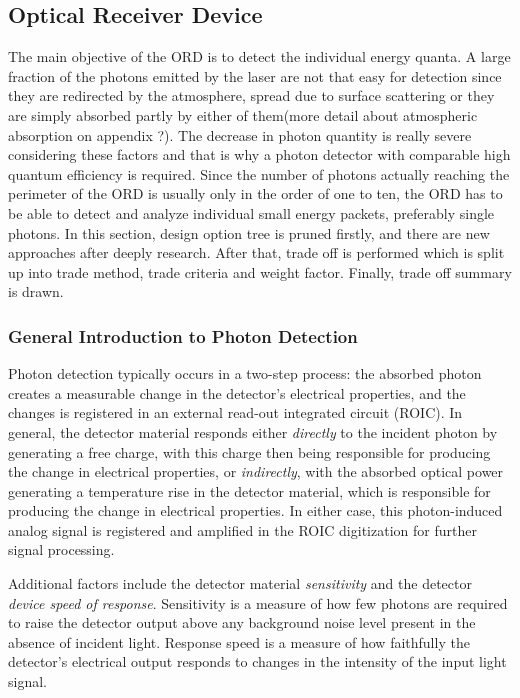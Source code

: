 \subsection{Optical Receiver Device}
\label{TOORD}
The main objective of the \ac{ORD} is to detect the individual energy quanta. A large fraction of the photons emitted by the \acs{laser} are not that easy for detection since they are redirected by the atmosphere, spread due to surface scattering or they are simply absorbed partly by either of them(more detail about atmospheric absorption on appendix ?). The decrease in photon quantity is really severe considering these factors and that is why a photon detector with comparable high quantum efficiency is required. Since the number of photons actually reaching the perimeter of the \ac{ORD} is usually only in the order of one to ten, the \acs{ORD} has to be able to detect and analyze individual small energy packets, preferably single photons. In this section, design option tree is pruned firstly, and there are new approaches after deeply research. After that, trade off is performed which is split up into trade method, trade criteria and weight factor. Finally, trade off summary is drawn.

\subsubsection{General Introduction to Photon Detection}
\label{introReceiver}
Photon detection typically occurs in a two-step process: the absorbed photon creates a measurable change in the detector's electrical properties, and the changes is registered in an external read-out integrated circuit (\acs{ROIC}). In general, the detector material responds either \textit{directly} to the incident photon by generating a free charge, with this charge then being responsible for producing the change in electrical properties, or \textit{indirectly}, with the absorbed optical power generating a temperature rise in the detector material, which is responsible for producing the change in electrical properties. In either case, this photon-induced analog signal is registered and amplified in the \acs{ROIC} digitization for further signal processing. 

Additional factors include the detector material \textit{sensitivity} and the detector \textit{device speed of response}. Sensitivity is a measure of how few photons are required to raise the detector output above any background noise level present in the absence of incident light. Response speed is a measure of how faithfully the detector's electrical output responds to changes in the intensity of the input light signal.

